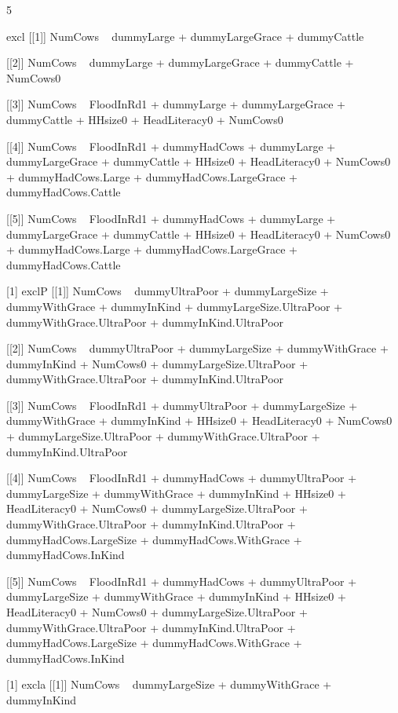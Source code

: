 \begin{Schunk}
\begin{Soutput}
[1] 5
\end{Soutput}
\begin{Soutput}
[1] excl
[[1]]
NumCows ~ dummyLarge + dummyLargeGrace + dummyCattle

[[2]]
NumCows ~ dummyLarge + dummyLargeGrace + dummyCattle + NumCows0

[[3]]
NumCows ~ FloodInRd1 + dummyLarge + dummyLargeGrace + dummyCattle + 
    HHsize0 + HeadLiteracy0 + NumCows0

[[4]]
NumCows ~ FloodInRd1 + dummyHadCows + dummyLarge + dummyLargeGrace + 
    dummyCattle + HHsize0 + HeadLiteracy0 + NumCows0 + dummyHadCows.Large + 
    dummyHadCows.LargeGrace + dummyHadCows.Cattle

[[5]]
NumCows ~ FloodInRd1 + dummyHadCows + dummyLarge + dummyLargeGrace + 
    dummyCattle + HHsize0 + HeadLiteracy0 + NumCows0 + dummyHadCows.Large + 
    dummyHadCows.LargeGrace + dummyHadCows.Cattle

[1] exclP
[[1]]
NumCows ~ dummyUltraPoor + dummyLargeSize + dummyWithGrace + 
    dummyInKind + dummyLargeSize.UltraPoor + dummyWithGrace.UltraPoor + 
    dummyInKind.UltraPoor

[[2]]
NumCows ~ dummyUltraPoor + dummyLargeSize + dummyWithGrace + 
    dummyInKind + NumCows0 + dummyLargeSize.UltraPoor + dummyWithGrace.UltraPoor + 
    dummyInKind.UltraPoor

[[3]]
NumCows ~ FloodInRd1 + dummyUltraPoor + dummyLargeSize + dummyWithGrace + 
    dummyInKind + HHsize0 + HeadLiteracy0 + NumCows0 + dummyLargeSize.UltraPoor + 
    dummyWithGrace.UltraPoor + dummyInKind.UltraPoor

[[4]]
NumCows ~ FloodInRd1 + dummyHadCows + dummyUltraPoor + dummyLargeSize + 
    dummyWithGrace + dummyInKind + HHsize0 + HeadLiteracy0 + 
    NumCows0 + dummyLargeSize.UltraPoor + dummyWithGrace.UltraPoor + 
    dummyInKind.UltraPoor + dummyHadCows.LargeSize + dummyHadCows.WithGrace + 
    dummyHadCows.InKind

[[5]]
NumCows ~ FloodInRd1 + dummyHadCows + dummyUltraPoor + dummyLargeSize + 
    dummyWithGrace + dummyInKind + HHsize0 + HeadLiteracy0 + 
    NumCows0 + dummyLargeSize.UltraPoor + dummyWithGrace.UltraPoor + 
    dummyInKind.UltraPoor + dummyHadCows.LargeSize + dummyHadCows.WithGrace + 
    dummyHadCows.InKind

[1] excla
[[1]]
NumCows ~ dummyLargeSize + dummyWithGrace + dummyInKind


\end{Soutput}
\end{Schunk}
